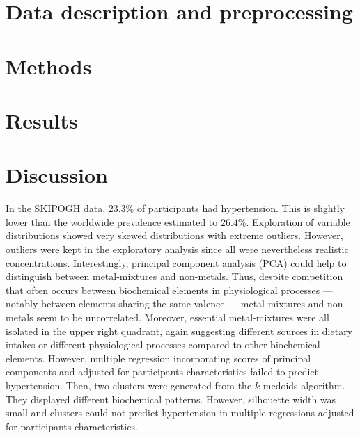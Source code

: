 \documentclass[a4paper]{book}
\begin{document}

\chapter{Data description and preprocessing}
\label{ch:Data}




\chapter{Methods}
\label{ch:Methods}




\chapter{Results}




\chapter{Discussion}

In the SKIPOGH data, 23.3\% of participants had hypertension. This is slightly lower than the worldwide prevalence estimated to $26.4\%$. Exploration of variable distributions showed very skewed distributions with extreme outliers. However, outliers were kept in the exploratory analysis since all were nevertheless realistic concentrations. Interestingly, principal component analysis (PCA) could help to distinguish between metal-mixtures and non-metals.  Thus, despite competition that often occurs between biochemical elements in physiological processes --- notably between elements sharing the same valence --- metal-mixtures and non-metals seem to be uncorrelated. Moreover, essential metal-mixtures were all isolated in the upper right quadrant, again suggesting different sources in dietary intakes or different physiological processes compared to other biochemical elements. However, multiple regression incorporating scores of principal components and adjusted for participants characteristics failed to predict hypertension. Then, two clusters were generated from the $k$-medoids algorithm. They displayed different biochemical patterns. However, silhouette width was small and clusters could not predict hypertension in multiple regressions adjusted for participants characteristics.
\end{document}
